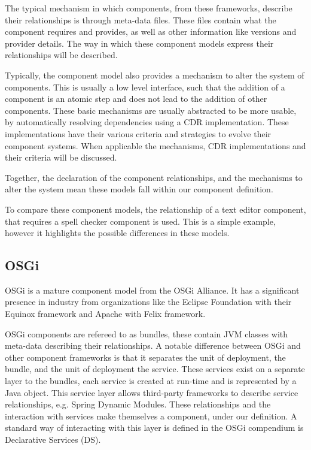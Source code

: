 The typical mechanism in which components, from these frameworks, describe their relationships is through meta-data files.
These files contain what the component requires and provides, as well as other information like versions and provider details.
The way in which these component models express their relationships will be described.

Typically, the component model also provides a mechanism to alter the system of components.
This is usually a low level interface, such that the addition of a component is an atomic step and does not lead to the addition of other components.
These basic mechanisms are usually abstracted to be more usable, by automatically resolving dependencies using a CDR implementation.
These implementations have their various criteria and strategies to evolve their component systems.
When applicable the mechanisms, CDR implementations and their criteria will be discussed.

Together, the declaration of the component relationships, and the mechanisms to alter the system mean these models fall within our component definition.

To compare these component models, the relationship of a text editor component, that requires a spell checker component is used.
This is a simple example, however it highlights the possible differences in these models.


\subsection{OSGi}
OSGi is a mature component model from the OSGi Alliance.
It has a significant presence in industry \cite{Kriens2008} from organizations like the Eclipse Foundation with their Equinox framework and Apache with Felix framework.

OSGi components are refereed to as bundles, these contain JVM classes with meta-data describing their relationships.
A notable difference between OSGi and other component frameworks is that it separates the unit of deployment, the bundle, and the unit of deployment the service.
These services exist on a separate layer to the bundles, each service is created at run-time and is represented by a Java object.
This service layer allows third-party frameworks to describe service relationships, e.g. Spring Dynamic Modules.
These relationships and the interaction with services make themselves a component, under our definition.
A standard way of interacting with this layer is defined in the OSGi compendium is Declarative Services (DS).

